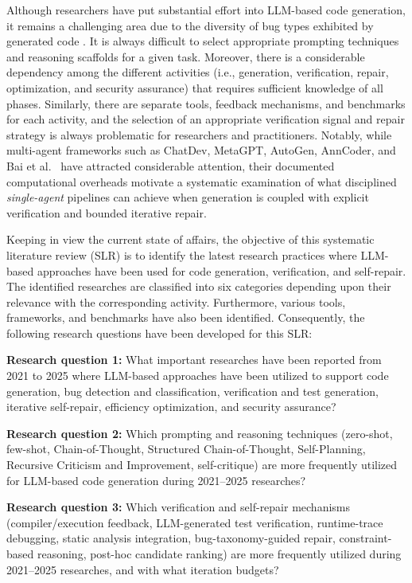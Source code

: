 \documentclass[10pt,a4paper]{article}
\begin{document}
Although researchers have put substantial effort into LLM-based code generation, it remains a challenging area due to the diversity of bug types exhibited by generated code \cite{dou2026}. It is always difficult to select appropriate prompting techniques and reasoning scaffolds for a given task. Moreover, there is a considerable dependency among the different activities (i.e., generation, verification, repair, optimization, and security assurance) that requires sufficient knowledge of all phases. Similarly, there are separate tools, feedback mechanisms, and benchmarks for each activity, and the selection of an appropriate verification signal and repair strategy is always problematic for researchers and practitioners. Notably, while multi-agent frameworks such as ChatDev, MetaGPT, AutoGen, AnnCoder, and Bai et al.~\cite{qian2023chatdev,hong2023metagpt,wu2023autogen,zhang2025anncoder,bai2025collab} have attracted considerable attention, their documented computational overheads motivate a systematic examination of what disciplined \textit{single-agent} pipelines can achieve when generation is coupled with explicit verification and bounded iterative repair.

Keeping in view the current state of affairs, the objective of this systematic literature review (SLR) is to identify the latest research practices where LLM-based approaches have been used for code generation, verification, and self-repair. The identified researches are classified into six categories depending upon their relevance with the corresponding activity. Furthermore, various tools, frameworks, and benchmarks have also been identified. Consequently, the following research questions have been developed for this SLR:

\textbf{Research question 1:} What important researches have been reported from 2021 to 2025 where LLM-based approaches have been utilized to support code generation, bug detection and classification, verification and test generation, iterative self-repair, efficiency optimization, and security assurance?

\textbf{Research question 2:} Which prompting and reasoning techniques (zero-shot, few-shot, Chain-of-Thought, Structured Chain-of-Thought, Self-Planning, Recursive Criticism and Improvement, self-critique) are more frequently utilized for LLM-based code generation during 2021--2025 researches?

\textbf{Research question 3:} Which verification and self-repair mechanisms (compiler/execution feedback, LLM-generated test verification, runtime-trace debugging, static analysis integration, bug-taxonomy-guided repair, constraint-based reasoning, post-hoc candidate ranking) are more frequently utilized during 2021--2025 researches, and with what iteration budgets?
\end{document}
